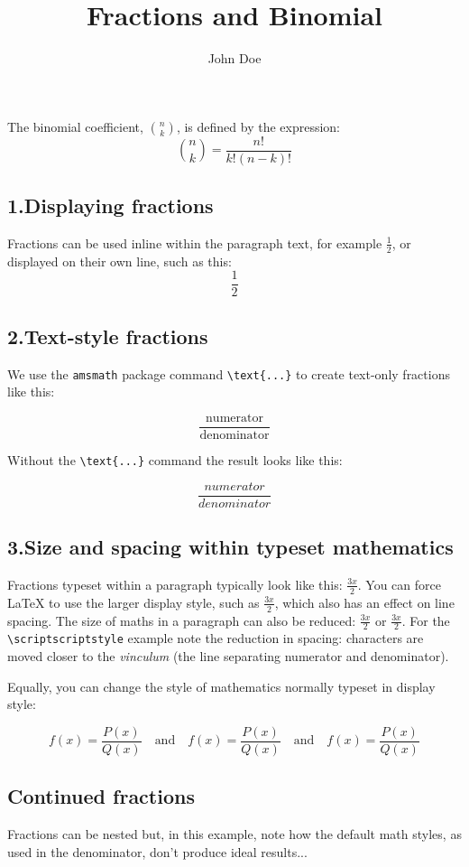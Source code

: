 \documentclass{article}
\title{Fractions and Binomial}
\author{John Doe}
\begin{document}
	\maketitle
The binomial coefficient, \(\binom{n}{k}\), is defined by the expression:
\[
\binom{n}{k} = \frac{n!}{k!(n-k)!}
\]
\subsection*{1.Displaying fractions}
Fractions can be used inline within the paragraph text, for 
example \(\frac{1}{2}\), or displayed on their own line, 
such as this:
\[\frac{1}{2}\]

\subsection*{2.Text-style fractions}

We use the \texttt{amsmath} package command
\verb|\text{...}| to create text-only fractions
like this:

\[\frac{\text{numerator}}{\text{denominator}}\]

Without the \verb|\text{...}| command the result 
looks like this:

\[\frac{numerator}{denominator}\]

\subsection*{3.Size and spacing within typeset mathematics}
Fractions typeset within a paragraph typically look like this: \(\frac{3x}{2}\). You can force \LaTeX{} to use the larger display style, such as \( \displaystyle \frac{3x}{2} \), which also has an effect on line spacing. The size of maths in a paragraph can also be reduced: \(\scriptstyle \frac{3x}{2}\) or \(\scriptscriptstyle \frac{3x}{2}\). For the \verb|\scriptscriptstyle| example note the reduction in spacing: characters are moved closer to the \textit{vinculum} (the line separating numerator and denominator).

Equally, you can change the style of mathematics normally typeset in display style:

\[f(x)=\frac{P(x)}{Q(x)}\quad \textrm{and}\quad \textstyle f(x)=\frac{P(x)}{Q(x)}\quad \textrm{and}\quad \scriptstyle f(x)=\frac{P(x)}{Q(x)}\]

\subsection*{Continued fractions}
Fractions can be nested but, in this example, note how the default math styles, as used in the denominator, don't produce ideal results...
\end{document}
